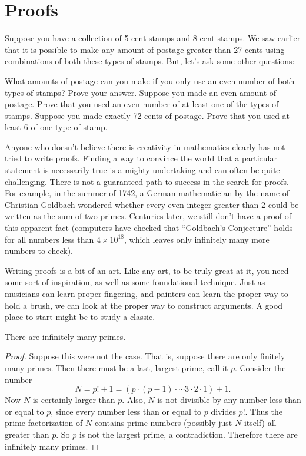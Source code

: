 \documentclass[12pt]{article}
\begin{document}
\section{Proofs}
\begin{activity}
Suppose you have a collection of 5-cent stamps and 8-cent stamps.  We saw earlier that it is possible to make any amount of postage greater than 27 cents using combinations of both these types of stamps.  But, let's ask some other questions:
\begin{questions}
\question What amounts of postage can you make if you only use an even number of both types of stamps? Prove your answer.
\vfill
\question Suppose you made an even amount of postage.  Prove that you used an even number of at least one of the types of stamps.
\vfill
\question Suppose you made exactly 72 cents of postage.  Prove that you used at least 6 of one type of stamp.
\vfill
\end{questions}

\end{activity}


Anyone who doesn't believe there is creativity in mathematics clearly has not tried to write proofs.  Finding a way to convince the world that a particular statement is necessarily true is a mighty undertaking and can often be quite challenging.  There is not a guaranteed path to success in the search for proofs.  For example, in the summer of 1742, a German mathematician by the name of Christian Goldbach wondered whether every even integer greater than 2 could be written as the sum of two primes.  Centuries later, we still don't have a proof of this apparent fact (computers have checked that ``Goldbach's Conjecture'' holds for all numbers less than $4\times 10^{18}$, which leaves only infinitely many more numbers to check).

Writing proofs is a bit of an art.  Like any art, to be truly great at it, you need some sort of inspiration, as well as some foundational technique.  Just as musicians can learn proper fingering, and painters can learn the proper way to hold a brush, we can look at the proper way to construct arguments.  A good place to start might be to study a classic.


 \begin{theorem}
  There are infinitely many primes.
 \end{theorem}

 \begin{proof}
  Suppose this were not the case.  That is, suppose there are only finitely many primes.  Then there must be a last, largest prime, call it $p$. Consider the number
  \[N = p! + 1 = (p \cdot (p-1) \cdot \cdots 3\cdot 2 \cdot 1) + 1.\]
  Now $N$ is certainly larger than $p$.  Also, $N$ is not divisible by any number less than or equal to $p$, since every number less than or equal to $p$ divides $p!$.  Thus the prime factorization of $N$ contains prime numbers (possibly just $N$ itself) all greater than $p$.  So $p$ is not the largest prime, a contradiction.  Therefore there are infinitely many primes.
 \end{proof}
\end{document}
